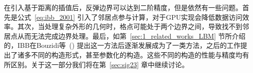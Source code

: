 在引入基于距离的插值后，反弹边界可以达到二阶精度，但是依然有一些问题。首先是公式~\ref{eq:ibb_2001} 引入了邻居点参与计算，对于GPU实现会降低数据访问效率。其次，当处理复杂外形的几何时，格点可能处于两个边界之间，导致找不到邻居点从而无法完成边界处理。最后，如第~\ref{sec:1_related_works_LBM} 节所介绍的，IBB在Bouzidi等~(\citeyear{Bouzidi-2001}) 提出这一方法后逐渐发展成为了一类方法，之后的工作提出了诸多不同的构造形式，甚至参数化的构造。这些不同的构造的性能与精度均有所区别。关于这一部分我们将在第~\ref{sec:sig23} 章中继续讨论。